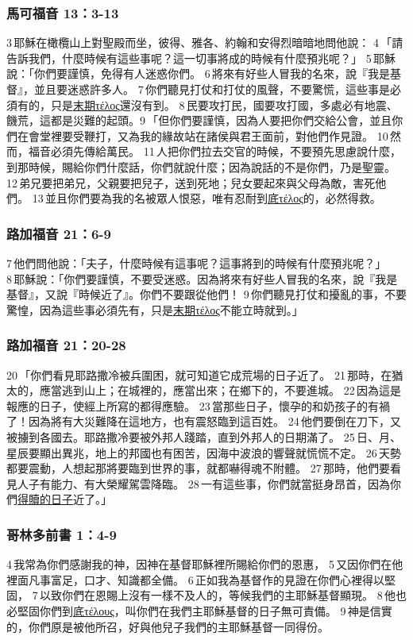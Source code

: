 \subsubsection{馬可福音 13：3-13}
3 耶穌在橄欖山上對聖殿而坐，彼得、雅各、約翰和安得烈暗暗地問他說： 4 「請告訴我們，什麼時候有這些事呢？這一切事將成的時候有什麼預兆呢？」 5 耶穌說：「你們要謹慎，免得有人迷惑你們。 6 將來有好些人冒我的名來，說『我是基督』，並且要迷惑許多人。 7 你們聽見打仗和打仗的風聲，不要驚慌，這些事是必須有的，只是\underline{末期τέλος}還沒有到。 8 民要攻打民，國要攻打國，多處必有地震、饑荒，這都是災難的起頭。9 「但你們要謹慎，因為人要把你們交給公會，並且你們在會堂裡要受鞭打，又為我的緣故站在諸侯與君王面前，對他們作見證。 10 然而，福音必須先傳給萬民。 11 人把你們拉去交官的時候，不要預先思慮說什麼，到那時候，賜給你們什麼話，你們就說什麼；因為說話的不是你們，乃是聖靈。 12 弟兄要把弟兄，父親要把兒子，送到死地；兒女要起來與父母為敵，害死他們。 13 並且你們要為我的名被眾人恨惡，唯有忍耐到\underline{底τέλος}的，必然得救。

\subsubsection{路加福音 21：6-9}
7 他們問他說：「夫子，什麼時候有這事呢？這事將到的時候有什麼預兆呢？」 8 耶穌說：「你們要謹慎，不要受迷惑。因為將來有好些人冒我的名來，說『我是基督』，又說『時候近了』。你們不要跟從他們！ 9 你們聽見打仗和擾亂的事，不要驚惶，因為這些事必須先有，只是\underline{末期τέλος}不能立時就到。」
\subsubsection{路加福音 21：20-28}
20 「你們看見耶路撒冷被兵圍困，就可知道它成荒場的日子近了。 21 那時，在猶太的，應當逃到山上；在城裡的，應當出來；在鄉下的，不要進城。 22 因為這是報應的日子，使經上所寫的都得應驗。 23 當那些日子，懷孕的和奶孩子的有禍了！因為將有大災難降在這地方，也有震怒臨到這百姓。 24 他們要倒在刀下，又被擄到各國去。耶路撒冷要被外邦人踐踏，直到外邦人的日期滿了。 25 日、月、星辰要顯出異兆，地上的邦國也有困苦，因海中波浪的響聲就慌慌不定。 26 天勢都要震動，人想起那將要臨到世界的事，就都嚇得魂不附體。 27 那時，他們要看見人子有能力、有大榮耀駕雲降臨。 28 一有這些事，你們就當挺身昂首，因為你們\underline{得贖的日子}近了。」

\subsubsection{哥林多前書 1：4-9}
4 我常為你們感謝我的神，因神在基督耶穌裡所賜給你們的恩惠， 5 又因你們在他裡面凡事富足，口才、知識都全備。 6 正如我為基督作的見證在你們心裡得以堅固， 7 以致你們在恩賜上沒有一樣不及人的，等候我們的主耶穌基督顯現。 8 他也必堅固你們到\underline{底τέλους}，叫你們在我們主耶穌基督的日子無可責備。 9 神是信實的，你們原是被他所召，好與他兒子我們的主耶穌基督一同得份。


